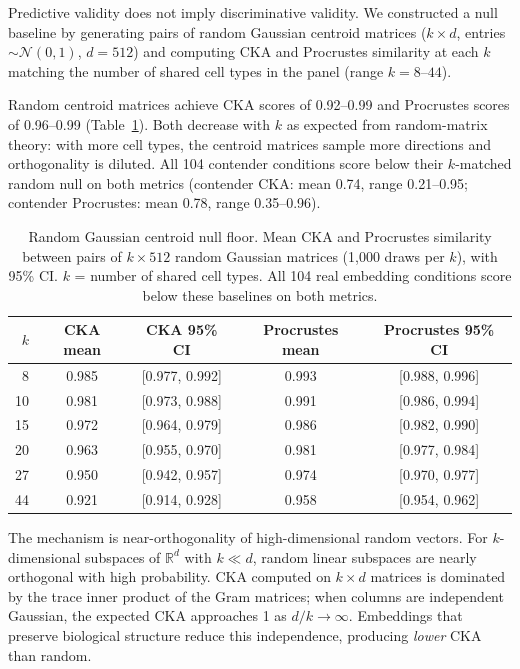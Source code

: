 \documentclass[11pt]{article}
\newcommand{\R}{\mathbb{R}}
\begin{document}
Predictive validity does not imply discriminative validity. We
constructed a null baseline by generating pairs of random Gaussian
centroid matrices ($k \times d$, entries $\sim \mathcal{N}(0,1)$, $d
= 512$) and computing CKA and Procrustes similarity at each $k$
matching the number of shared cell types in the panel (range $k =
8$--$44$).

Random centroid matrices achieve CKA scores of 0.92--0.99 and
Procrustes scores of 0.96--0.99 (Table~\ref{tab:nullfloor}). Both
decrease with $k$ as expected from random-matrix theory: with more cell
types, the centroid matrices sample more directions and orthogonality is
diluted. All 104 contender conditions score below their $k$-matched
random null on both metrics (contender CKA: mean 0.74, range
0.21--0.95; contender Procrustes: mean 0.78, range 0.35--0.96).

\begin{table}[t]
\centering
\caption{Random Gaussian centroid null floor. Mean CKA and Procrustes
similarity between pairs of $k \times 512$ random Gaussian matrices
(1,000 draws per $k$), with 95\% CI. $k$ = number of shared cell
types. All 104 real embedding conditions score below these baselines
on both metrics.}
\label{tab:nullfloor}
\small
\begin{tabular}{@{}rcccc@{}}
\toprule
$k$ & CKA mean & CKA 95\% CI & Procrustes mean & Procrustes 95\% CI \\
\midrule
8  & 0.985 & [0.977, 0.992] & 0.993 & [0.988, 0.996] \\
10 & 0.981 & [0.973, 0.988] & 0.991 & [0.986, 0.994] \\
15 & 0.972 & [0.964, 0.979] & 0.986 & [0.982, 0.990] \\
20 & 0.963 & [0.955, 0.970] & 0.981 & [0.977, 0.984] \\
27 & 0.950 & [0.942, 0.957] & 0.974 & [0.970, 0.977] \\
44 & 0.921 & [0.914, 0.928] & 0.958 & [0.954, 0.962] \\
\bottomrule
\end{tabular}
\end{table}

The mechanism is near-orthogonality of high-dimensional random vectors.
For $k$-dimensional subspaces of $\R^d$ with $k \ll d$, random linear
subspaces are nearly orthogonal with high probability. CKA computed on
$k \times d$ matrices is dominated by the trace inner product of the
Gram matrices; when columns are independent Gaussian, the expected CKA
approaches 1 as $d/k \rightarrow \infty$. Embeddings that preserve
biological structure reduce this independence, producing \emph{lower}
CKA than random.
\end{document}

